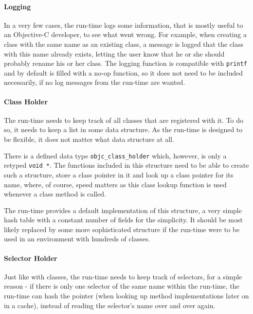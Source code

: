 \paragraph{Logging}

In a very few cases, the run-time logs some information, that is mostly useful to an Objective-C developer, to see what went wrong. For example, when creating a class with the same name as an existing class, a message is logged that the class with this name already exists, letting the user know that he or she should probably rename his or her class. The logging function is compatible with \verb=printf= and by default is filled with a no-op function, so it does not need to be included necessarily, if no log messages from the run-time are wanted.

\paragraph{Class Holder}

The run-time needs to keep track of all classes that are registered with it. To do so, it needs to keep a list in some data structure. As the run-time is designed to be flexible, it does not matter what data structure at all.

There is a defined data type \verb=objc_class_holder= which, however, is only a retyped \verb=void *=. The functions included in this structure need to be able to create such a structure, store a class pointer in it and look up a class pointer for its name, where, of course, speed matters as this class lookup function is used whenever a class method is called.

The run-time provides a default implementation of this structure, a very simple hash table with a constant number of fields for the simplicity. It should be most likely replaced by some more sophisticated structure if the run-time were to be used in an environment with hundreds of classes.

\paragraph{Selector Holder}

Just like with classes, the run-time needs to keep track of selectors, for a simple reason - if there is only one selector of the same name within the run-time, the run-time can hash the pointer (when looking up method implementations later on in a cache), instead of reading the selector's name over and over again.

